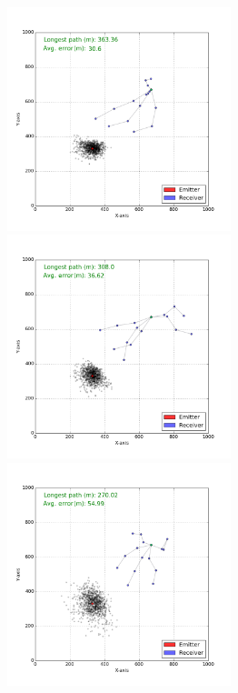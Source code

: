 \documentclass[10pt,a4paper]{book}
\begin{document}
\begin{figure}[H]
\centering
\begin{minipage}{60mm}
  \centering
\includegraphics[width=65mm]{stepmoea_5uavs_3steps/Pareto_10.png}
\end{minipage}
\begin{minipage}{60mm}
  \centering
\includegraphics[width=65mm]{stepmoea_5uavs_3steps/Pareto_15.png}
\end{minipage}
\begin{minipage}{60mm}
  \centering
\includegraphics[width=65mm]{stepmoea_5uavs_3steps/Pareto_20.png}
\end{minipage}
\begin{minipage}{60mm}

\end{minipage}
\end{figure}
\end{document}
